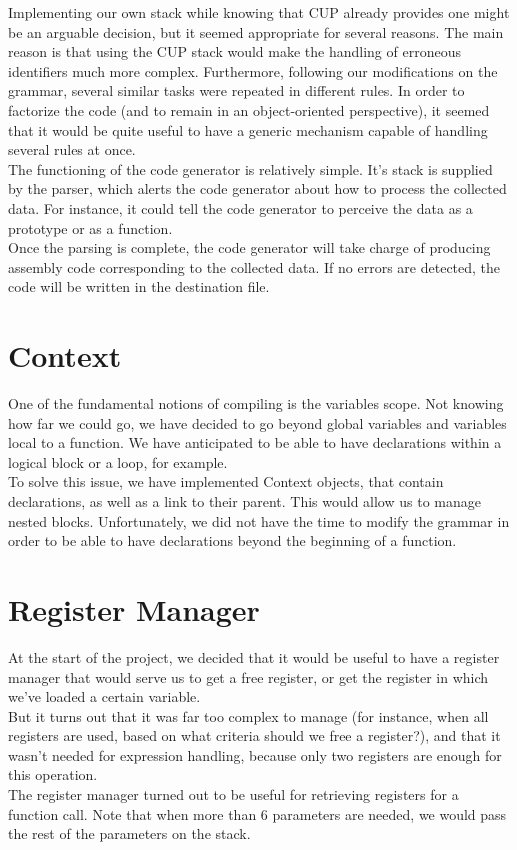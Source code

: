 \documentclass{article}
\begin{document}
Implementing our own stack while knowing that CUP already provides one might be an arguable decision, but it seemed appropriate for several reasons. The main reason is that using the CUP stack would make the handling of erroneous identifiers much more complex. Furthermore, following our modifications on the grammar, several similar tasks were repeated in different rules. In order to factorize the code (and to remain in an object-oriented perspective), it seemed that it would be quite useful to have a generic mechanism capable of handling several rules at once.\\

The functioning of the code generator is relatively simple. It's stack is supplied by the parser, which alerts the code generator about how to process the collected data. For instance, it could tell the code generator to perceive the data as a prototype or as a function.\\
Once the parsing is complete, the code generator will take charge of producing assembly code corresponding to the collected data. If no errors are detected, the code will be written in the destination file.


\section{Context}
One of the fundamental notions of compiling is the variables scope. Not knowing how far we could go, we have decided to go beyond global variables and variables local to a function. We have anticipated to be able to have declarations within a logical block or a loop, for example.\\
To solve this issue, we have implemented Context objects, that contain declarations, as well as a link to their parent. This would allow us to manage nested blocks. Unfortunately, we did not have the time to modify the grammar in order to be able to have declarations beyond the beginning of a function.


\section{Register Manager}
At the start of the project, we decided that it would be useful to have a register manager that would serve us to get a free register, or get the register in which we've loaded a certain variable.\\
But it turns out that it was far too complex to manage (for instance, when all registers are used, based on what criteria should we free a register?), and that it wasn't needed for expression handling, because only two registers are enough for this operation.\\
The register manager turned out to be useful for retrieving registers for a function call. Note that when more than 6 parameters are needed, we would pass the rest of the parameters on the stack.
\end{document}
